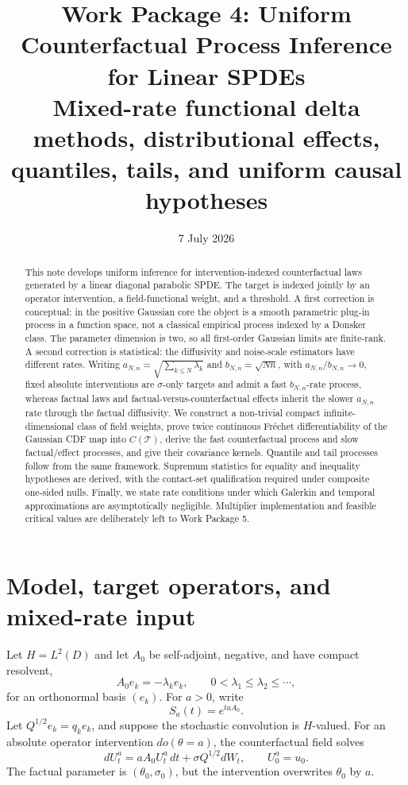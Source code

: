 \documentclass[11pt]{article}
\title{Work Package 4: Uniform Counterfactual Process Inference for Linear SPDEs\\
\large Mixed-rate functional delta methods, distributional effects, quantiles, tails, and uniform causal hypotheses}
\author{}
\date{7 July 2026}
\theoremstyle{remark}
\newcommand{\cT}{\mathcal T}
\newcommand{\an}{a_{N,n}}
\newcommand{\bn}{b_{N,n}}
\begin{document}
\maketitle

\begin{abstract}
This note develops uniform inference for intervention-indexed counterfactual laws generated by a linear diagonal parabolic SPDE.  The target is indexed jointly by an operator intervention, a field-functional weight, and a threshold.  A first correction is conceptual: in the positive Gaussian core the object is a smooth parametric plug-in process in a function space, not a classical empirical process indexed by a Donsker class.  The parameter dimension is two, so all first-order Gaussian limits are finite-rank.  A second correction is statistical: the diffusivity and noise-scale estimators have different rates.  Writing $\an=\sqrt{\sum_{k\le N}\lambda_k}$ and $\bn=\sqrt{Nn}$, with $\an/\bn\to0$, fixed absolute interventions are $\sigma$-only targets and admit a fast $\bn$-rate process, whereas factual laws and factual-versus-counterfactual effects inherit the slower $\an$ rate through the factual diffusivity.  We construct a non-trivial compact infinite-dimensional class of field weights, prove twice continuous Fr\'echet differentiability of the Gaussian CDF map into $C(\cT)$, derive the fast counterfactual process and slow factual/effect processes, and give their covariance kernels.  Quantile and tail processes follow from the same framework.  Supremum statistics for equality and inequality hypotheses are derived, with the contact-set qualification required under composite one-sided nulls.  Finally, we state rate conditions under which Galerkin and temporal approximations are asymptotically negligible.  Multiplier implementation and feasible critical values are deliberately left to Work Package 5.
\end{abstract}

\section{Model, target operators, and mixed-rate input}

Let $H=L^2(D)$ and let $A_0$ be self-adjoint, negative, and have compact resolvent,
\[
 A_0e_k=-\lambda_ke_k,
 \qquad 0<\lambda_1\le\lambda_2\le\cdots,
\]
for an orthonormal basis $(e_k)$.  For $a>0$, write
\[
 S_a(t)=e^{taA_0}.
\]
Let $Q^{1/2}e_k=q_ke_k$, and suppose the stochastic convolution is $H$-valued.  For an absolute operator intervention $do(\theta=a)$, the counterfactual field solves
\begin{equation}\label{eq:cf-spde}
 dU_t^a=aA_0U_t^a\,dt+\sigma Q^{1/2}dW_t,
 \qquad U_0^a=u_0.
\end{equation}
The factual parameter is $(\theta_0,\sigma_0)$, but the intervention overwrites $\theta_0$ by $a$.
\end{document}
